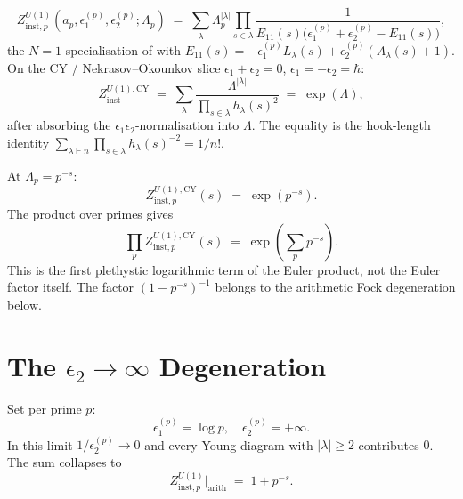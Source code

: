 \begin{definition}
\label{v4-arith:def:abelian-per-prime}
\begin{equation}
Z^{U(1)}_{\mathrm{inst},p}(a_{p},\epsilon_{1}^{(p)},\epsilon_{2}^{(p)};\Lambda_{p})
\;=\;\sum_{\lambda}\Lambda_{p}^{|\lambda|}
\prod_{s\in\lambda}\frac{1}{E_{11}(s)\bigl(\epsilon_{1}^{(p)}+\epsilon_{2}^{(p)}-E_{11}(s)\bigr)},
\end{equation}
the \(N=1\) specialisation of 
with \(E_{11}(s)=-\epsilon_{1}^{(p)}L_{\lambda}(s)+\epsilon_{2}^{(p)}(A_{\lambda}(s)+1)\).
On the CY / Nekrasov--Okounkov slice \(\epsilon_{1}+\epsilon_{2}=0\),
\(\epsilon_{1}=-\epsilon_{2}=\hbar\):
\begin{equation}
Z^{U(1),\mathrm{CY}}_{\mathrm{inst}}\;=\;\sum_{\lambda}\frac{\Lambda^{|\lambda|}}{\prod_{s\in\lambda}h_{\lambda}(s)^{2}}
\;=\;\exp(\Lambda),
\end{equation}
after absorbing the \(\epsilon_{1}\epsilon_{2}\)-normalisation into
\(\Lambda\). The equality is the hook-length identity
\(\sum_{\lambda\vdash n}\prod_{s\in\lambda}h_{\lambda}(s)^{-2}=1/n!\).
\end{definition}

\begin{computation}
\label{v4-arith:comp:per-prime-Euler}
At \(\Lambda_{p}=p^{-s}\):
\begin{equation}
Z^{U(1),\mathrm{CY}}_{\mathrm{inst},p}(s)\;=\;\exp(p^{-s}).
\end{equation}
The product over primes gives
\begin{equation}
\prod_{p}Z^{U(1),\mathrm{CY}}_{\mathrm{inst},p}(s)\;=\;\exp\!\left(\sum_{p}p^{-s}\right).
\end{equation}
This is the first plethystic logarithmic term of the Euler product, not
the Euler factor itself. The factor \((1-p^{-s})^{-1}\) belongs to the
arithmetic Fock degeneration below.
\end{computation}

\section{The \(\epsilon_{2}\to\infty\) Degeneration}
\label{v4-arith:nk:epsilon-2-degeneration}

\begin{definition}
\label{v4-arith:def:degenerate-per-prime}
Set per prime \(p\):
\begin{equation*}
\epsilon_{1}^{(p)}=\log p,\quad\epsilon_{2}^{(p)}=+\infty.
\end{equation*}
In this limit \(1/\epsilon_{2}^{(p)}\to 0\) and every Young diagram
with \(|\lambda|\geq 2\) contributes \(0\). The sum collapses to
\begin{equation}
Z^{U(1)}_{\mathrm{inst},p}\bigr|_{\mathrm{arith}}\;=\;1+p^{-s}.
\end{equation}
\end{definition}

